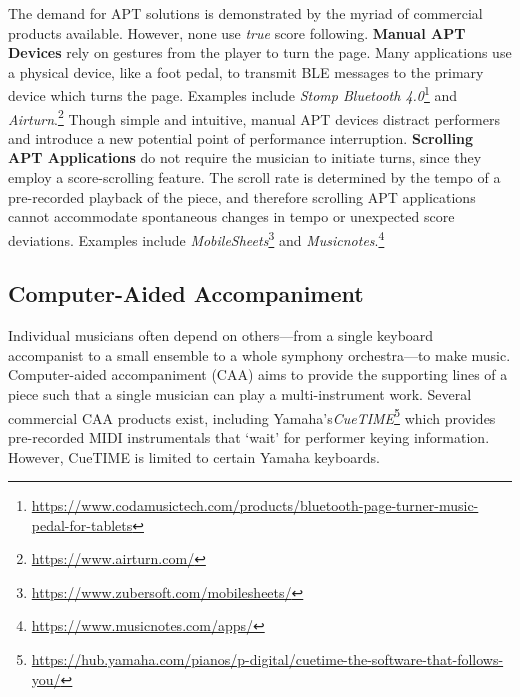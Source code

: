 The demand for APT solutions is demonstrated by the myriad of commercial products available. However, none use \textit{true} score following. \textbf{Manual APT Devices} rely on gestures from the player to turn the page. Many applications use a physical device, like a foot pedal, to transmit BLE messages to the primary device which turns the page. Examples include \textit{Stomp Bluetooth 4.0}\footnote{\href{https://www.codamusictech.com/products/bluetooth-page-turner-music-pedal-for-tablets}{https://www.codamusictech.com/products/bluetooth-page-turner-music-pedal-for-tablets}} and \textit{Airturn}.\footnote{\href{https://www.airturn.com/}{https://www.airturn.com/}} Though simple and intuitive, manual APT devices distract performers and introduce a new potential point of performance interruption.  \textbf{Scrolling APT Applications} do not require the musician to initiate turns, since they employ a score-scrolling feature. The scroll rate is determined by the \gls{tempo} of a pre-recorded playback of the piece, and therefore scrolling APT applications cannot accommodate spontaneous changes in tempo or unexpected score deviations. Examples include \textit{MobileSheets}\footnote{\href{https://www.zubersoft.com/mobilesheets/}{https://www.zubersoft.com/mobilesheets/}} and \textit{Musicnotes}.\footnote{\href{https://www.musicnotes.com/apps/}{https://www.musicnotes.com/apps/}}


\subsection{Computer-Aided Accompaniment}
Individual musicians often depend on others—from a single keyboard accompanist to a small ensemble to a whole symphony orchestra—to make music. Computer-aided accompaniment (CAA) aims to provide the supporting lines of a piece such that a single musician can play a multi-instrument work.  Several commercial CAA products exist, including Yamaha’s\textit{CueTIME}\footnote{\href{https://hub.yamaha.com/pianos/p-digital/cuetime-the-software-that-follows-you/}{https://hub.yamaha.com/pianos/p-digital/cuetime-the-software-that-follows-you/}} which provides pre-recorded MIDI instrumentals that ‘wait’ for performer keying information. However, CueTIME is limited to certain Yamaha keyboards. 

